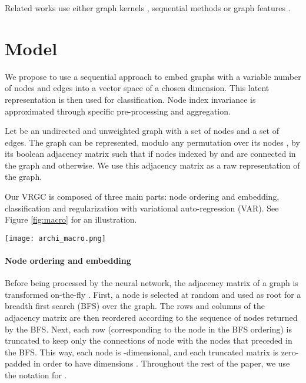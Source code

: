 \documentclass{article} \usepackage{iclr2019_conference}
\begin{document}
Related works use either graph kernels \citep{nikolentzos2017kernel, nikolentzos2017matching, nikolentzos2018degeneracy, neumann2016propagation, shervashidze2011weisfeiler, yanardag2015deep}, sequential methods \citep{callut2008classification, xu2012protein, jin2018learning, you2018graphrnn} or graph features \citep{barnett2016feature, DBLP:journals/corr/NarayananCVCLJ17, gomez2017dynamics, dutta2017high}.


\section{Model}
\label{sec:model}

We propose to use a sequential approach to embed graphs with a variable number of nodes and edges into a vector space of a chosen dimension. This latent representation is then used for classification. Node index invariance is approximated through specific pre-processing and aggregation.

Let  be an undirected and unweighted graph with  a set of nodes and  a set of edges. The graph  can be represented, modulo any permutation  over its nodes , by its boolean adjacency matrix  such that  if nodes indexed by  and  are connected in the graph and  otherwise. We use this adjacency matrix as a raw representation of the graph. 

Our VRGC is composed of three main parts: node ordering and embedding, classification and regularization with variational auto-regression (VAR). See Figure \ref{fig:macro} for an illustration. 


\begin{figure*}
    \centering
    \texttt{[image: archi\_macro.png]}
    \caption{Macroscopic representation of VRGC.}
    \label{fig:macro}
\end{figure*}



\paragraph{Node ordering and embedding}
\label{subsec:node ordering}

Before being processed by the neural network, the adjacency matrix of a graph is transformed on-the-fly \citep{you2018graphrnn}. First, a node is selected at random and used as root for a breadth first search (BFS) over the graph. The rows and columns of the adjacency matrix are then reordered according to the sequence of nodes returned by the BFS. Next, each row  (corresponding to the  node in the BFS ordering) is truncated to keep only the connections of node  with the  nodes that preceded in the BFS. This way, each node is -dimensional, and each truncated matrix is zero-padded in order to have dimensions . Throughout the rest of the paper, we use the notation  for . 
\end{document}
